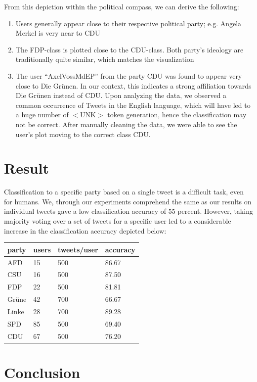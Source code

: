 \documentclass[10pt, oneside]{article}
\begin{document}
\begin{multicols}{2}
From this depiction within the political compass, we can derive the following:

\begin{enumerate}
	\item Users generally appear close to their respective political party; e.g. Angela Merkel is very near to CDU
	\item The FDP-class is plotted close to the CDU-class. Both party's ideology are traditionally quite similar, which matches the visualization
	\item The user ``AxelVossMdEP'' from the party CDU was found to appear very close to Die Grünen. In our context, this indicates a strong affiliation towards Die Grünen instead of CDU. Upon analyzing the data, we observed a common occurrence  of Tweets in the English language, which will have led to a huge number of $<$UNK$>$ token generation, hence the classification may not be correct. After manually cleaning the data, we were able to see the user's plot moving to the correct class CDU.
\end{enumerate}

\section{Result}
Classification to a specific party based on a single tweet is a difficult task, even for humans. We, through our experiments comprehend the same as our results on individual tweets gave a low classification accuracy of 55 percent.
However, taking majority voting over a set of tweets for a specific user led to a considerable increase in the classification accuracy depicted below:
\begin{center}
	\begin{tabular}{|l|l|l|l|}
	\hline
	\textbf{party} & \textbf{users} & \textbf{tweets/user} & \textbf{accuracy} \\ \hline
	AFD & 15 & 500 & 86.67 \\
	CSU & 16 & 500 & 87.50 \\
	FDP & 22 & 500 & 81.81 \\
	Grüne & 42 & 700 & 66.67 \\
	Linke & 28 & 700 & 89.28 \\
	SPD & 85 & 500 & 69.40 \\
	CDU & 67 & 500 & 76.20 \\
	\hline
	\end{tabular}
\end{center}


\section{Conclusion}


\end{multicols}
\end{document}
